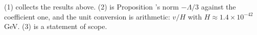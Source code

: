 (1) collects the results above. (2) is Proposition 's norm $-\Lambda/3$ against the coefficient one, and the unit conversion is arithmetic: $v/H$ with $H \approx 1.4 \times 10^{-42}$ GeV. (3) is a statement of scope.
